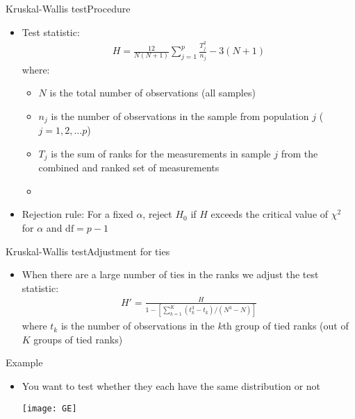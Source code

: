 \documentclass[xcolor=dvipsnames]{beamer}
\begin{document}
\begin{frame}{Kruskal-Wallis test}{Procedure}
	\begin{itemize}
		\item Test statistic:
		\begin{gather*}
		H = \frac{12}{N (N+1)} \sum_{j=1}^p \frac{T_j^2}{n_j} - 3(N + 1)
		\end{gather*}
		where: 
		\begin{itemize}
			\item $N$ is the total number of observations (all samples)
			\item $n_j$ is the number of observations in the sample from population $j$ ($j = 1, 2, \hdots p$)
			\item $T_j$ is the sum of ranks for the measurements in sample $j$ from the combined and ranked set of measurements
			\item[]
		\end{itemize}
		
		\item Rejection rule: For a fixed $\alpha$, reject $H_0$ if $H$ exceeds the critical value of $\chi^2$ for $\alpha$ and $\text{df} = p - 1$
	\end{itemize}
\end{frame}

\begin{frame}{Kruskal-Wallis test}{Adjustment for ties}
	\begin{itemize}
		\item When there are a large number of ties in the ranks we adjust the test statistic:
		\begin{gather*}
			H' = \frac{H}{1 - \left[ \sum_{k=1}^K (t_k^3 - t_k)/(N^3 - N) \right]}
		\end{gather*}
		where $t_k$ is the number of observations in the $k$th group of tied ranks (out of $K$ groups of tied ranks)
	\end{itemize}
\end{frame}

\begin{frame}{Example}
	\begin{itemize}
		\item You want to test whether they each have the same distribution or not
		\begin{center}
			\texttt{[image: GE]}
		\end{center}
	\end{itemize}
\end{frame}
\end{document}
